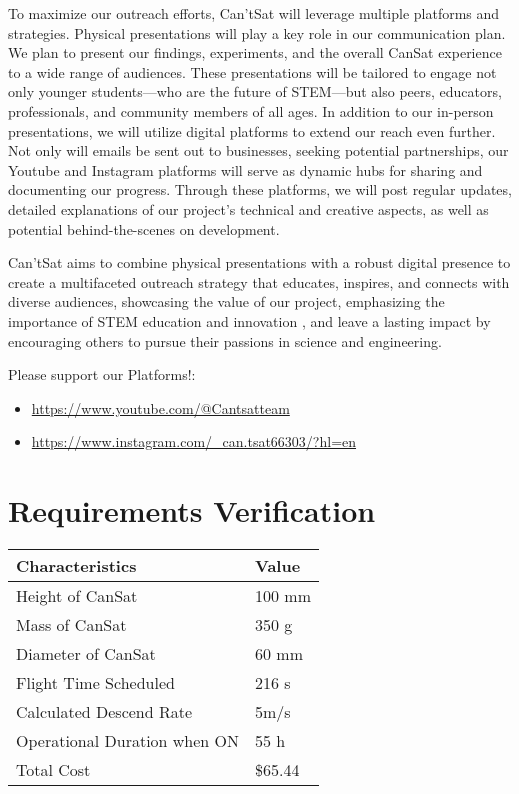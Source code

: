 \documentclass[10pt,twocolumn]{article}
\begin{document}
To maximize our outreach efforts, Can’tSat will leverage multiple platforms and strategies. Physical presentations will play a key role in our communication plan. We plan to present our findings, experiments, and the overall CanSat experience to a wide range of audiences. These presentations will be tailored to engage not only younger students—who are the future of STEM—but also peers, educators, professionals, and community members of all ages. In addition to our in-person presentations, we will utilize digital platforms to extend our reach even further. Not only will emails be sent out to businesses, seeking potential partnerships, our Youtube and Instagram platforms will serve as dynamic hubs for sharing and documenting our progress. Through these platforms, we will post regular updates, detailed explanations of our project’s technical and creative aspects, as well as potential behind-the-scenes on development.

Can’tSat aims to combine physical presentations with a robust digital presence to create a multifaceted outreach strategy that educates, inspires, and connects with diverse audiences, showcasing the value of our project, emphasizing the importance of STEM education and innovation , and leave a lasting impact by encouraging others to pursue their passions in science and engineering.

Please support our Platforms!:

\begin{itemize}
    \item \url{https://www.youtube.com/@Cantsatteam}
    \item \url{https://www.instagram.com/_can.tsat66303/?hl=en}
\end{itemize}

\section{\textbf{Requirements Verification}}

\begin{center}
\begin{tabular}{|p{2cm}|p{4cm}|}
\hline
\rowcolor{yellow!30}
\textbf{Characteristics} & \textbf{Value} \\
\hline
Height of CanSat & 100 mm \\
Mass of CanSat & 350 g \\
Diameter of CanSat & 60 mm \\
Flight Time Scheduled & 216 s \\
Calculated Descend Rate & 5m/s \\
Operational Duration when ON & 55 h \\
Total Cost & \$65.44\\
\hline
\end{tabular}
\end{center}
\end{document}

